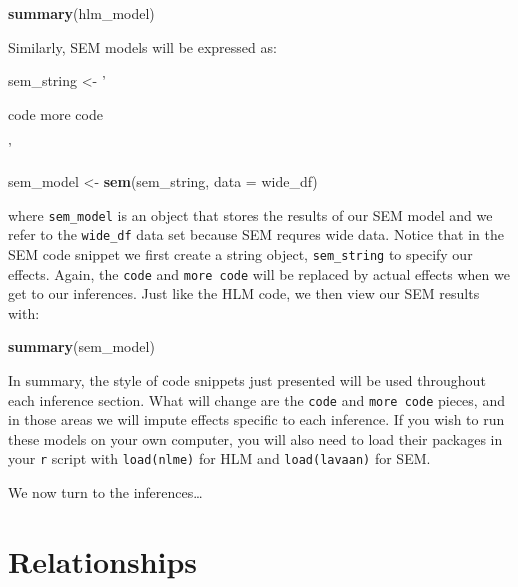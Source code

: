 \documentclass[english,,man]{apa6}
\newenvironment{Shaded}{\begin{snugshade}}{\end{snugshade}}
\newcommand{\DataTypeTok}[1]{\textcolor[rgb]{0.13,0.29,0.53}{#1}}
\newcommand{\KeywordTok}[1]{\textcolor[rgb]{0.13,0.29,0.53}{\textbf{#1}}}
\newcommand{\NormalTok}[1]{#1}
\newcommand{\StringTok}[1]{\textcolor[rgb]{0.31,0.60,0.02}{#1}}
\theoremstyle{definition}
\theoremstyle{definition}
\theoremstyle{definition}
\theoremstyle{remark}
\begin{document}
\begin{Shaded}
\begin{Highlighting}[]
\KeywordTok{summary}\NormalTok{(hlm_model)}
\end{Highlighting}
\end{Shaded}

\noindent Similarly, SEM models will be expressed as:

\begin{Shaded}
\begin{Highlighting}[]
\NormalTok{sem_string <-}\StringTok{ '}

\StringTok{    code}
\StringTok{    more code}

\StringTok{'}

\NormalTok{sem_model <-}\StringTok{ }\KeywordTok{sem}\NormalTok{(sem_string, }
                 \DataTypeTok{data =}\NormalTok{ wide_df)}
\end{Highlighting}
\end{Shaded}

\noindent where \texttt{sem\_model} is an object that stores the results
of our SEM model and we refer to the \texttt{wide\_df} data set because
SEM requres wide data. Notice that in the SEM code snippet we first
create a string object, \texttt{sem\_string} to specify our effects.
Again, the \texttt{code} and \texttt{more\ code} will be replaced by
actual effects when we get to our inferences. Just like the HLM code, we
then view our SEM results with:

\begin{Shaded}
\begin{Highlighting}[]
\KeywordTok{summary}\NormalTok{(sem_model)}
\end{Highlighting}
\end{Shaded}

In summary, the style of code snippets just presented will be used
throughout each inference section. What will change are the
\texttt{code} and \texttt{more\ code} pieces, and in those areas we will
impute effects specific to each inference. If you wish to run these
models on your own computer, you will also need to load their packages
in your \texttt{r} script with \texttt{load(nlme)} for HLM and
\texttt{load(lavaan)} for SEM.

We now turn to the inferences\ldots{}

\hypertarget{relationships}{%
\section{Relationships}\label{relationships}}
\end{document}
